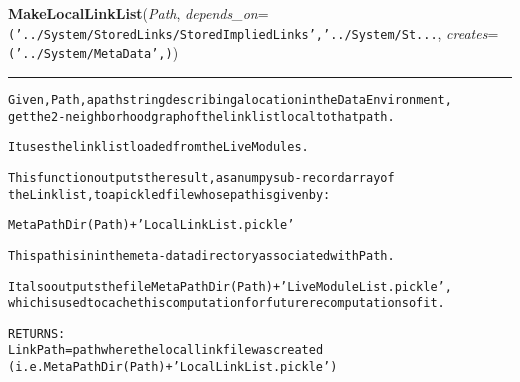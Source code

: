 \hspace{.8\funcindent}\begin{boxedminipage}{\funcwidth}

    \raggedright \textbf{MakeLocalLinkList}(\textit{Path}, \textit{depends\_on}={\tt ('../System/StoredLinks/StoredImpliedLinks','../System/St\texttt{...}}, \textit{creates}={\tt ('../System/MetaData',)})

    \vspace{-1.5ex}

    \rule{\textwidth}{0.5\fboxrule}
\setlength{\parskip}{2ex}
\begin{alltt}

Given, Path, a path string describing a location in the Data Environment, 
get the 2-neighborhood graph of the linklist local to that path.

It uses the linklist loaded from the Live Modules. 

This function outputs the result, as a numpy sub- record array of 
the Linklist, to a pickled file whose path is given by:

        MetaPathDir(Path) + 'LocalLinkList.pickle'

This path is in in the meta-data directory associated with Path.

It also outputs the file MetaPathDir(Path) + 'LiveModuleList.pickle', 
which is used to cache this computation for future recomputations of it. 

RETURNS:
        LinkPath = path where the locallink file was created
        (i.e. MetaPathDir(Path) + 'LocalLinkList.pickle')
\end{alltt}

\setlength{\parskip}{1ex}
    \end{boxedminipage}

    \label{System:SystemGraphOperations:MakeLocalLinkGraph}

    \vspace{0.5ex}

